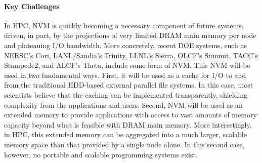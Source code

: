 
\paragraph{Key Challenges}
In HPC, NVM is quickly becoming a necessary component of future systems, driven, in part, by the projections of very limited DRAM main memory per node and plateauing I/O bandwidth. More concretely, recent DOE systems, such as NERSC's Cori, LANL/Sandia's Trinity, LLNL's Sierra, OLCF's Summit, TACC's Stampede2, and ALCF's Theta, include some form of NVM. This NVM will be used in two fundamental ways. First, it will be used as a cache for I/O to and from the traditional HDD-based external parallel file systems. In this case, most scientists believe that the caching can be implemented transparently, shielding complexity from the applications and users. Second, NVM will be used as an extended memory to provide applications with access to vast amounts of memory capacity beyond what is feasible with DRAM main memory. More interestingly, in HPC, this extended memory can be aggregated into a much larger, scalable memory space than that provided by a single node alone. In this second case, however, no portable and scalable programming systems exist.

